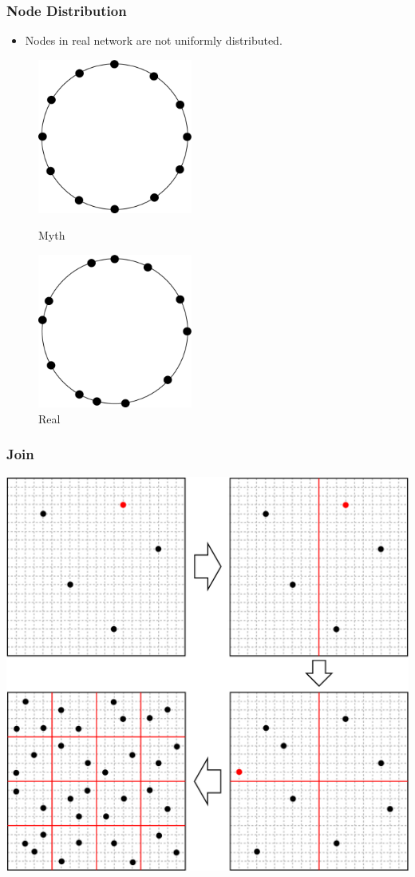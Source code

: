 \documentclass[red]{beamer}
\begin{document}
\begin{frame}
\frametitle{Node Distribution}
\begin{itemize}
\item Nodes in real network are not uniformly distributed. 
\end{itemize}
\begin{figure}
\begin{minipage}{5cm}
\centering
\includegraphics[width=2.0in]{figs/myth}
\caption{Myth} 
\end{minipage}
\begin{minipage}{5cm}
\centering
\includegraphics[width=2.0in]{figs/real}
\caption{Real}
\end{minipage}
\end{figure}
\end{frame}
\begin{frame}
\frametitle{Join}
\begin{center}
\includegraphics[scale=0.15]{figs/ed2_join.eps}
\end{center}
\end{frame}
\end{document}
